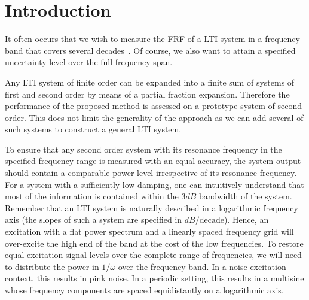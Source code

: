 

\section{Introduction} \label{sec:intro}
  It often occurs that we wish to measure the \gls{FRF} of a \gls{LTI} system in a frequency band that covers several decades~\citep{Bragos2001,Sanchez2011,Niedostatkiewicz2009,VanGheem2004}.
  Of course, we also want to attain a specified uncertainty level over the full frequency span.

  Any LTI system of finite order can be expanded into a  finite sum of systems of first and second order by means of a partial fraction expansion\citep{Oppenheim1983}.
  Therefore the performance of the proposed method is assessed on a prototype system of second order.
  This does not limit the generality of the approach as we can add several of such systems to construct a general LTI system.
  
  To ensure that any second order system with its resonance frequency in the specified frequency range is measured with an equal accuracy, the system output should contain a comparable power level irrespective of its resonance frequency.
  For a system with a sufficiently low damping, one can intuitively understand that most of the information is contained within the $3 \unit{dB}$ bandwidth of the system.
  Remember that an LTI system is naturally described in a logarithmic frequency axis (the slopes of such a system are specified in $\unit{dB}/\text{decade}$).
  Hence, an excitation with a flat power spectrum and a linearly spaced frequency grid will over-excite the high end of the band at the cost of the low frequencies.
  To restore equal excitation signal levels over the complete range of frequencies, we will need to distribute the power in $1/\omega$ over the frequency band.
  In a noise excitation context, this results in pink noise.
  In a periodic setting, this results in a multisine whose frequency components are spaced equidistantly on a logarithmic axis.
  
